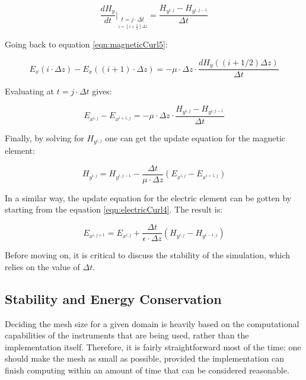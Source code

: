 \begin{equation}
	\label{eqn:timeDerivativeH}
	\frac{d H_y}{dt} \bigg\rvert_{\underset{z = (i + \frac{1}{2}) \Delta z}{t=j \cdot \Delta t}} = \frac{H_{y^{i,j}} - H_{y^{i,j-1}}}{\Delta t}
\end{equation}

Going back to equation \ref{eqn:magneticCurl5}:

\begin{equation}
	\label{eqn:timeDerivativeE2}
	E_x(i \cdot \Delta z) - E_x((i+1) \cdot \Delta z) = -\mu \cdot \Delta z \cdot \frac{d H_y((i+1/2)\Delta z) }{\Delta t}
\end{equation}

Evaluating at $t = j \cdot \Delta t$ gives:

\begin{equation}
	\label{eqn:timeDerivativeE3}
	E_{x^{i,j}} - E_{x^{i+1,j}} = -\mu \cdot \Delta z \cdot \frac{H_{y^{i,j}} - H_{y^{i,j-1}}}{\Delta t}
\end{equation}

Finally, by solving for ${H_{y^{i,j}}}$ one can get the update equation for the magnetic element:
	
\begin{equation}
	\label{eqn:magneticUpdate}
	H_{y^{i,j}} = H_{y^{i,j-1}} - \frac{\Delta t}{\mu \cdot \Delta z}(E_{x^{i,j}} - E_{x^{i+1,j}})
\end{equation}

In a similar way, the update equation for the electric element can be gotten by starting from the equation \ref{eqn:electricCurl4}. The result is:

\begin{equation}
	\label{eqn:electricUpdate}
	E_{x^{i,j+1}} = E_{x^{i,j}} + \frac{\Delta t}{\epsilon \cdot \Delta z}(H_{y^{i,j}} -  H_{y^{i-1,j}})
\end{equation}

Before moving on, it is critical to discuss the stability of the simulation, which relies on the value of $\Delta t$.

\subsection{Stability and Energy Conservation}\label{sec:stability}
Deciding the mesh size for a given domain is heavily based on the computational capabilities of the instruments that are being used, rather than the implementation itself. Therefore, it is fairly straightforward most of the time: one should make the mesh as small as possible, provided the implementation can finish computing within an amount of time that can be considered reasonable.

